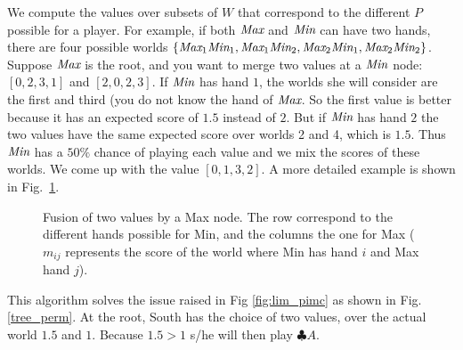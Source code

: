 \documentclass[runningheads]{llncs}
\begin{document}
We compute the values over subsets of $W$ that correspond to the different $P$ possible for a player. For example, if both  $\emph{Max}$ and $\emph{Min}$ can have two hands, there are four possible worlds $\{\mbox{\em Max}_1\mbox{\em Min}_1, \mbox{\em Max}_1\mbox{\em Min}_2, \mbox{\em Max}_2\mbox{\em Min}_1, \mbox{\em Max}_2\mbox{\em Min}_2\}$. Suppose $\mbox{\em Max}$ is the root, and you want to merge two values at a $\mbox{\em Min}$ node: $[0,2,3,1]$ and $[2,0,2,3]$. If $\mbox{\em Min}$ has hand $1$, the worlds she will consider are the first and third (you do not know the hand of $\mbox{\em Max}$. So the first value is better because it has an expected score of $1.5$ instead of $2$. But if $\mbox{\em Min}$ has hand $2$ the two values have the same expected score over worlds 2 and 4, which is $1.5$. Thus $\emph{Min}$ has a $50\%$ chance of playing each value and we mix the scores of these worlds. We come up with the value $[0,1,3,2]$. A more detailed example is shown in Fig.~\ref{fusion_perm}.
%
\begin{figure}[t]
    \centering
    \caption{Fusion of two values by a Max node. The row correspond to the different hands possible for Min, and the columns the one for Max ($m_{ij}$ represents the score of the world where Min has hand $i$ and Max hand $j$).}
    \label{fusion_perm}
    \vspace{0.5cm} 
\end{figure}
%
This algorithm solves the issue raised in Fig \ref{fig:lim_pimc} as 
shown in Fig. \ref{tree_perm}. At the root, South has the choice of two values, over the actual world $1.5$ and $1$. Because $1.5 > 1$ s/he will then play $\clubsuit A$.
\end{document}
